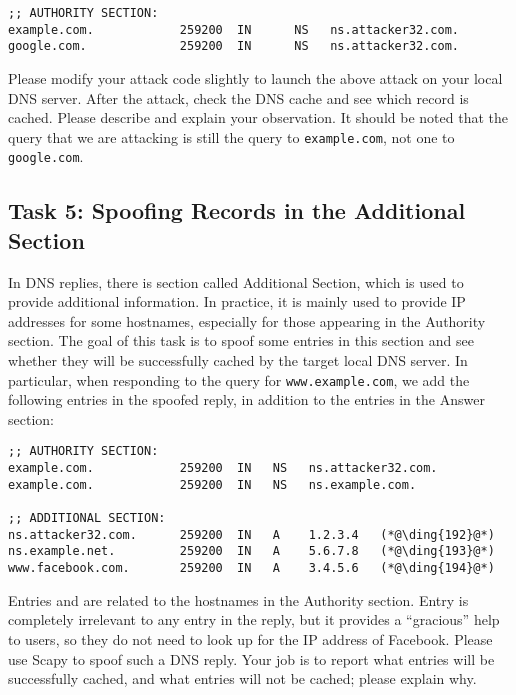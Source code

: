 \begin{lstlisting}
;; AUTHORITY SECTION:
example.com.            259200  IN      NS   ns.attacker32.com.
google.com.             259200  IN      NS   ns.attacker32.com.
\end{lstlisting}

Please modify your attack code slightly to launch 
the above attack on your local DNS server. After the 
attack, check the DNS cache and see which record is cached.
Please describe and explain your observation. It should be noted that the query
that we are attacking is still the query to \texttt{example.com}, not one
to \texttt{google.com}.  


\subsection{Task 5: Spoofing Records in the Additional Section}

In DNS replies, there is section called Additional Section, which is used
to provide additional information. In practice, it is mainly used to
provide IP addresses for some hostnames, especially for those appearing in the
Authority section. The goal of this task is to spoof some entries 
in this section and see whether they will be successfully cached by the
target local DNS server. In particular, when responding to 
the query for \texttt{www.example.com}, we add the following entries 
in the spoofed reply, in addition to the entries in the Answer section:


\begin{lstlisting}
;; AUTHORITY SECTION:
example.com.            259200  IN   NS   ns.attacker32.com.
example.com.            259200  IN   NS   ns.example.com.

;; ADDITIONAL SECTION:
ns.attacker32.com.      259200  IN   A    1.2.3.4   (*@\ding{192}@*)
ns.example.net.         259200  IN   A    5.6.7.8   (*@\ding{193}@*)
www.facebook.com.       259200  IN   A    3.4.5.6   (*@\ding{194}@*)
\end{lstlisting}

Entries  and  are related to the hostnames in
the Authority section. Entry  is completely irrelevant to
any entry in the reply, but it provides a ``gracious'' help to
users, so they do not need to look up for the IP address
of Facebook. Please use Scapy to spoof such a DNS reply. Your job is
to report what entries will be successfully cached, and what entries will
not be cached; please explain why. 
 

